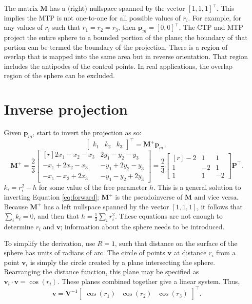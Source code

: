 \documentclass[]{interact}
\begin{document}
The matrix $\mathbf M$ has a (right) nullspace spanned by the vector
$[1, 1, 1]^\top$. This implies the MTP is not one-to-one for all possible values
of $r_i$. For example, for any values of $r_i$ such that $r_1 = r_2 = r_3$, then
$\mathbf p_m = [0, 0]^\top$. The CTP and MTP project the entire sphere to a
bounded portion of the plane; the boundary of that portion can be termed the
boundary of the projection. There is a region of overlap that is mapped into
the same area but in reverse orientation.
That region includes the antipodes of the control points.
In real applications, the overlap region of the sphere can be excluded.

\section{Inverse projection}
Given $\mathbf p_m$, start to invert the projection as so:
\begin{equation}\label{eq:inverse}
\begin{bmatrix*} k_1 & k_2 & k_3
\end{bmatrix*}^\top = \mathbf M^+ \mathbf p_m \,,
\end{equation}
\begin{equation}\label{eq:inversem}
\mathbf M^+ = \frac{2}{3}
\begin{bmatrix*}[r] 2x_1 - x_2 - x_3 & 2y_1 - y_2 - y_3 \\
-x_1 + 2x_2 - x_3 & -y_1 + 2y_2 - y_3 \\
-x_1 - x_2 + 2x_3 & -y_1 - y_2 + 2y_3
\end{bmatrix*} = \frac{2}{3}
\begin{bmatrix*}[r] -2 & 1 & 1 \\
1 & -2 & 1 \\
1 & 1 & -2
\end{bmatrix*}
\mathbf P^\top .
\end{equation}
$k_i = r^2_i - h$ for some value of the free parameter $h$. This is a general
solution to inverting Equation \ref{eq:forward}; $\mathbf M^+$ is the
pseudoinverse of $\mathbf M$ and vice versa. Because $\mathbf M^+$ has a left
nullspace spanned by the vector $[1, 1, 1]$, it follows that $\sum_i k_i = 0$,
and then that $h = \frac{1}{3}\sum_i r^2_i$.
These equations are not enough to determine $r_i$ and $\mathbf v$;
information about the sphere needs to be introduced.

To simplify the derivation, use $R=1$, such that distance on the surface of the
sphere has units of radians of arc. The circle of points $\mathbf v$ at
distance $r_i$ from a point $\mathbf v_i$ is simply the circle created by a
plane intersecting the sphere. Rearranging the distance function, this plane
may be specified as $\mathbf v_i \cdot \mathbf v = \cos\left(r_i\right).$
These planes combined together give a linear system. Thus,
\begin{equation}\label{eq:inversev}
  \mathbf v = \mathbf V^{-1} \begin{bmatrix*} \cos\left(r_1\right) &
  \cos\left(r_2\right) &
  \cos\left(r_3\right)
  \end{bmatrix*}^\top .
\end{equation}
\end{document}
